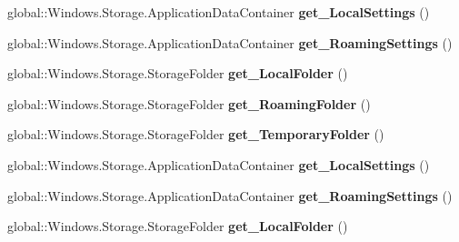 \begin{DoxyCompactItemize}
global\+::\+Windows.\+Storage.\+Application\+Data\+Container {\bfseries get\+\_\+\+Local\+Settings} ()
\item 
\mbox{\label{interface_windows_1_1_storage_1_1_i_application_data_a06655cd8ae7b5ba39077359585d19cea}} 
global\+::\+Windows.\+Storage.\+Application\+Data\+Container {\bfseries get\+\_\+\+Roaming\+Settings} ()
\item 
\mbox{\label{interface_windows_1_1_storage_1_1_i_application_data_ae3fadf1db189f66f22c74d1ee0e4b1bc}} 
global\+::\+Windows.\+Storage.\+Storage\+Folder {\bfseries get\+\_\+\+Local\+Folder} ()
\item 
\mbox{\label{interface_windows_1_1_storage_1_1_i_application_data_a408ead99bd13a953bad06b2efaba4fb0}} 
global\+::\+Windows.\+Storage.\+Storage\+Folder {\bfseries get\+\_\+\+Roaming\+Folder} ()
\item 
\mbox{\label{interface_windows_1_1_storage_1_1_i_application_data_a7cc8d124ebf36fe0c0d96117a3e09ff2}} 
global\+::\+Windows.\+Storage.\+Storage\+Folder {\bfseries get\+\_\+\+Temporary\+Folder} ()
\item 
\mbox{\label{interface_windows_1_1_storage_1_1_i_application_data_ad910253c6d0b20d011dce17a29c99e02}} 
global\+::\+Windows.\+Storage.\+Application\+Data\+Container {\bfseries get\+\_\+\+Local\+Settings} ()
\item 
\mbox{\label{interface_windows_1_1_storage_1_1_i_application_data_a06655cd8ae7b5ba39077359585d19cea}} 
global\+::\+Windows.\+Storage.\+Application\+Data\+Container {\bfseries get\+\_\+\+Roaming\+Settings} ()
\item 
\mbox{\label{interface_windows_1_1_storage_1_1_i_application_data_ae3fadf1db189f66f22c74d1ee0e4b1bc}} 
global\+::\+Windows.\+Storage.\+Storage\+Folder {\bfseries get\+\_\+\+Local\+Folder} ()
\item 
\mbox{\label{interface_windows_1_1_storage_1_1_i_application_data_a408ead99bd13a953bad06b2efaba4fb0}} 

\end{DoxyCompactItemize}
